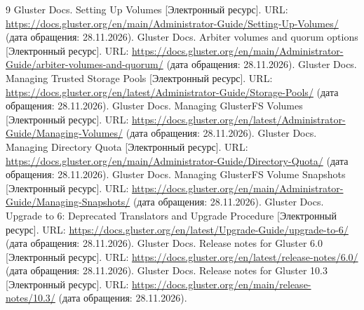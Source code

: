 \newpage
\renewcommand{\refname}{Список источников}
\begin{thebibliography}{9}
 Gluster Docs. Setting Up Volumes [Электронный ресурс]. URL: \url{https://docs.gluster.org/en/main/Administrator-Guide/Setting-Up-Volumes/} (дата обращения: 28.11.2026).
 Gluster Docs. Arbiter volumes and quorum options [Электронный ресурс]. URL: \url{https://docs.gluster.org/en/main/Administrator-Guide/arbiter-volumes-and-quorum/} (дата обращения: 28.11.2026).
 Gluster Docs. Managing Trusted Storage Pools [Электронный ресурс]. URL: \url{https://docs.gluster.org/en/latest/Administrator-Guide/Storage-Pools/} (дата обращения: 28.11.2026).
 Gluster Docs. Managing GlusterFS Volumes [Электронный ресурс]. URL: \url{https://docs.gluster.org/en/latest/Administrator-Guide/Managing-Volumes/} (дата обращения: 28.11.2026).
 Gluster Docs. Managing Directory Quota [Электронный ресурс]. URL: \url{https://docs.gluster.org/en/main/Administrator-Guide/Directory-Quota/} (дата обращения: 28.11.2026).
 Gluster Docs. Managing GlusterFS Volume Snapshots [Электронный ресурс]. URL: \url{https://docs.gluster.org/en/main/Administrator-Guide/Managing-Snapshots/} (дата обращения: 28.11.2026).
 Gluster Docs. Upgrade to 6: Deprecated Translators and Upgrade Procedure [Электронный ресурс]. URL: \url{https://docs.gluster.org/en/latest/Upgrade-Guide/upgrade-to-6/} (дата обращения: 28.11.2026).
 Gluster Docs. Release notes for Gluster 6.0 [Электронный ресурс]. URL: \url{https://docs.gluster.org/en/latest/release-notes/6.0/} (дата обращения: 28.11.2026).
 Gluster Docs. Release notes for Gluster 10.3 [Электронный ресурс]. URL: \url{https://docs.gluster.org/en/main/release-notes/10.3/} (дата обращения: 28.11.2026).
\end{thebibliography}
